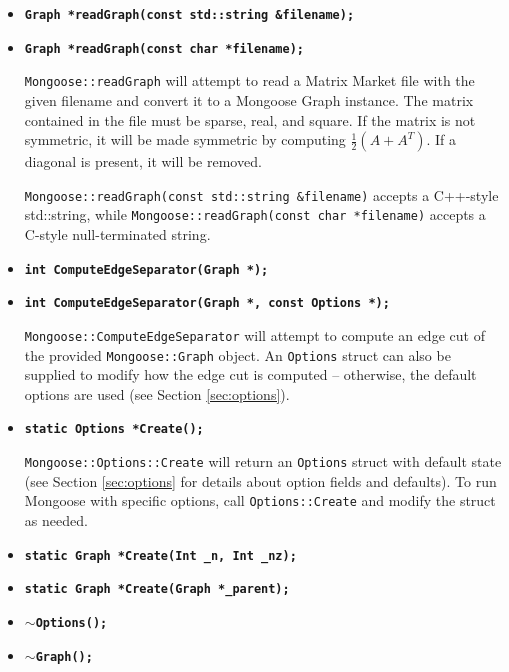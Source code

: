 \documentclass[letter]{article}
\begin{document}
\begin{itemize}
\item \textbf{\texttt{Graph *readGraph(const std::string \&filename);}} \vspace{-6pt}
\item \textbf{\texttt{Graph *readGraph(const char *filename);}}

\texttt{Mongoose::readGraph} will attempt to read a Matrix Market file with the given filename and convert it to a Mongoose Graph instance. The matrix contained in the file must be sparse, real, and square. If the matrix is not symmetric, it will be made symmetric by computing $\frac{1}{2}(A+A^T)$. If a diagonal is present, it will be removed.

\texttt{Mongoose::readGraph(const std::string \&filename)} accepts a C++-style std::string, while \texttt{Mongoose::readGraph(const char *filename)} accepts a C-style null-terminated string.
\vspace{6pt}
\item \textbf{\texttt{int ComputeEdgeSeparator(Graph *);}} \vspace{-6pt}
\item \textbf{\texttt{int ComputeEdgeSeparator(Graph *, const Options *);}}

\texttt{Mongoose::ComputeEdgeSeparator} will attempt to compute an edge cut of the provided \texttt{Mongoose::Graph} object. An \texttt{Options} struct can also be supplied to modify how the edge cut is computed -- otherwise, the default options are used (see Section \ref{sec:options}).
\vspace{6pt}
\item \textbf{\texttt{static Options *Create();}}

\texttt{Mongoose::Options::Create} will return an \texttt{Options} struct with default state (see Section \ref{sec:options} for details about option fields and defaults). To run Mongoose with specific options, call \texttt{Options::Create} and modify the struct as needed.
\vspace{6pt}
\item \textbf{\texttt{static Graph *Create(Int \_n, Int \_nz);}}
\item \textbf{\texttt{static Graph *Create(Graph *\_parent);}}

\vspace{6pt}
\item \textbf{\texttt{$\sim$Options();}}
\item \textbf{\texttt{$\sim$Graph();}}

\end{itemize}
\end{document}

